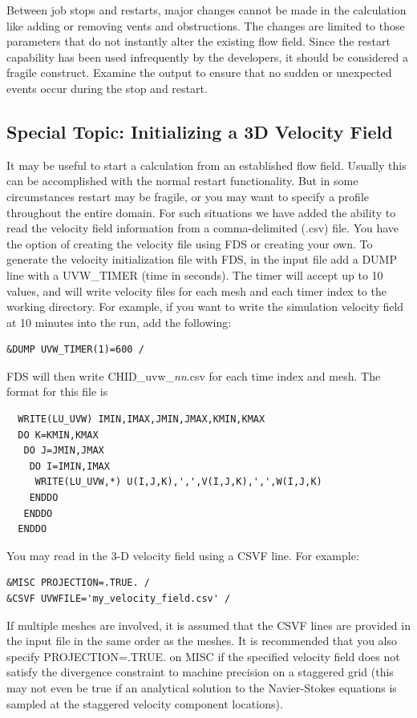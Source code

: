 \documentclass[11pt]{book}
\begin{document}
Between job stops and restarts, major changes cannot be made in the calculation
like adding or removing vents and obstructions. The changes are limited to those parameters that do
not instantly alter the existing flow field. Since the restart
capability has been used infrequently by the developers, it should be considered
a fragile construct. Examine the output
to ensure that no sudden or unexpected events occur during the stop and
restart.


\subsection{Special Topic: Initializing a 3D Velocity Field}
\label{info:velo_restart}
\label{info:CSVF}

It may be useful to start a calculation from an established flow field.  Usually this can be accomplished with the normal restart functionality.  But in some circumstances restart may be fragile, or you may want to specify a profile throughout the entire domain.  For such situations we have added the ability to read the velocity field information from a comma-delimited (.csv) file.  You have the option of creating the velocity file using FDS or creating your own.  To generate the velocity initialization file with FDS, in the input file add a {\ct DUMP} line with a {\ct UVW\_TIMER} (time in seconds).  The timer will accept up to 10 values, and will write velocity files for each mesh and each timer index to the working directory.  For example, if you want to write the simulation velocity field at 10 minutes into the run, add the following:
\begin{lstlisting}
&DUMP UVW_TIMER(1)=600 /
\end{lstlisting}
FDS will then write {\ct CHID\_uvw\_{\it nn}.csv} for each time index and mesh.  The format for this file is
\begin{lstlisting}
  WRITE(LU_UVW) IMIN,IMAX,JMIN,JMAX,KMIN,KMAX
  DO K=KMIN,KMAX
   DO J=JMIN,JMAX
    DO I=IMIN,IMAX
     WRITE(LU_UVW,*) U(I,J,K),',',V(I,J,K),',',W(I,J,K)
    ENDDO
   ENDDO
  ENDDO
\end{lstlisting}
You may read in the 3-D velocity field using a {\ct CSVF} line.  For example:
\begin{lstlisting}
&MISC PROJECTION=.TRUE. /
&CSVF UVWFILE='my_velocity_field.csv' /
\end{lstlisting}
If multiple meshes are involved, it is assumed that the {\ct CSVF} lines are provided in the input file in the same order as the meshes.  It is recommended that you also specify {\ct PROJECTION=.TRUE.} on {\ct MISC} if the specified velocity field does not satisfy the divergence constraint to machine precision on a staggered grid (this may not even be true if an analytical solution to the Navier-Stokes equations is sampled at the staggered velocity component locations).
\end{document}
